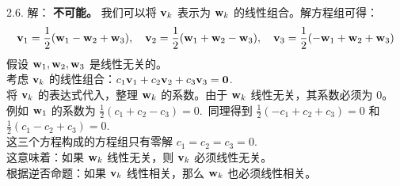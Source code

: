 \begin{exer}
2.6. 解：
\textbf{不可能。}
我们可以将 $\mathbf{v}_k$ 表示为 $\mathbf{w}_k$ 的线性组合。解方程组可得：
$$
\mathbf{v}_1 = \frac{1}{2}(\mathbf{w}_1 - \mathbf{w}_2 + \mathbf{w}_3), \quad
\mathbf{v}_2 = \frac{1}{2}(\mathbf{w}_1 + \mathbf{w}_2 - \mathbf{w}_3), \quad
\mathbf{v}_3 = \frac{1}{2}(-\mathbf{w}_1 + \mathbf{w}_2 + \mathbf{w}_3)
$$
假设 $\mathbf{w}_1, \mathbf{w}_2, \mathbf{w}_3$ 是线性无关的。
\\
考虑 $\mathbf{v}_k$ 的线性组合：$c_1 \mathbf{v}_1 + c_2 \mathbf{v}_2 + c_3 \mathbf{v}_3 = \mathbf{0}$.~
\\
将 $\mathbf{v}_k$ 的表达式代入，整理 $\mathbf{w}_k$ 的系数。由于 $\mathbf{w}_k$ 线性无关，其系数必须为 0。
\\
例如 $\mathbf{w}_1$ 的系数为 $\frac{1}{2}(c_1 + c_2 - c_3) = 0$.~同理得到 $\frac{1}{2}(-c_1 + c_2 + c_3) = 0$ 和 $\frac{1}{2}(c_1 - c_2 + c_3) = 0$.~
\\
这三个方程构成的方程组只有零解 $c_1 = c_2 = c_3 = 0$.~
\\
这意味着：如果 $\mathbf{w}_k$ 线性无关，则 $\mathbf{v}_k$ 必须线性无关。
\\
根据逆否命题：如果 $\mathbf{v}_k$ 线性相关，那么 $\mathbf{w}_k$ 也必须线性相关。

\vspace{5ex}



\end{exer}
